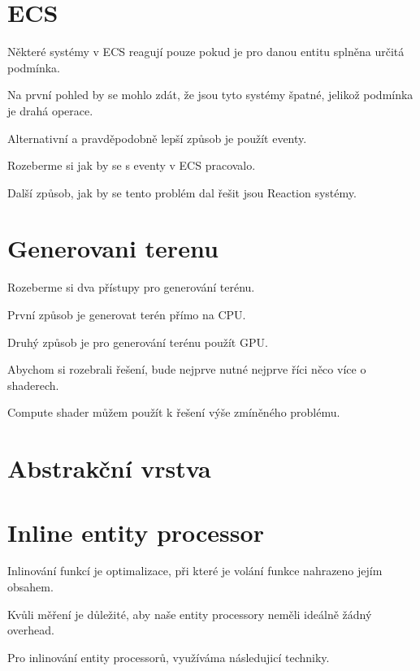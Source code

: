 \section{ECS}

Některé systémy v ECS reagují pouze pokud je pro danou entitu splněna určitá podmínka.

Na první pohled by se mohlo zdát, že jsou tyto systémy špatné, jelikož podmínka je drahá operace.

Alternativní a pravděpodobně lepší způsob je použít eventy.

Rozeberme si jak by se s eventy v ECS pracovalo.

Další způsob, jak by se tento problém dal řešit jsou Reaction systémy.


\section{Generovani terenu}

Rozeberme si dva přístupy pro generování terénu.

První způsob je generovat terén přímo na CPU.

Druhý způsob je pro generování terénu použít GPU.


Abychom si rozebrali řešení, bude nejprve nutné nejprve říci něco více o shaderech.

Compute shader můžem použít k řešení výše zmíněného problému.


\section{Abstrakční vrstva}


\section{Inline entity processor}

Inlinování funkcí je optimalizace, při které je volání funkce nahrazeno jejím obsahem.


Kvůli měření je důležité, aby naše entity processory neměli ideálně žádný overhead.

Pro inlinování entity processorů, využíváma následujicí techniky.


